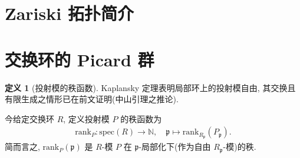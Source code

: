\documentclass{MainStyle}
\theoremstyle{definition}
\theoremstyle{definition}
\theoremstyle{definition}
\newtheorem{definition}{定义}
\theoremstyle{definition}
\theoremstyle{definition}
\theoremstyle{definition}
\theoremstyle{definition}
\theoremstyle{remark}
\theoremstyle{remark}
\begin{document}
\maketitle

\section{Zariski 拓扑简介}

\section{交换环的 Picard 群}

\begin{definition}[投射模的秩函数]
    Kaplansky 定理表明局部环上的投射模自由, 其交换且有限生成之情形已在前文证明(中山引理之推论).\par
    今给定交换环 $R$, 定义投射模 $P$ 的秩函数为
    \begin{align*}
        \mathrm{rank}_P:\mathrm{spec}(R)\to \mathbb N,\quad \mathfrak p\mapsto \mathrm{rank}_{R_{\mathfrak p}}(P_{\mathfrak p}).
    \end{align*}
    简而言之, $\mathrm{rank}_P(\mathfrak p)$ 是 $R$-模 $P$ 在 $\mathfrak p$-局部化下(作为自由 $R_{\mathfrak p}$-模)的秩.
\end{definition}
\end{document}
